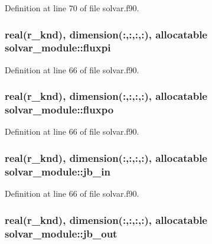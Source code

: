 Definition at line 70 of file solvar.\-f90.

\hypertarget{classsolvar__module_a9d3b4c1745b4b9a6145e2c08530d3daa}{
\subsubsection[{fluxpi}]{\setlength{\rightskip}{0pt plus 5cm}real(r\-\_\-knd), dimension(\-:,\-:,\-:,\-:), allocatable solvar\-\_\-module\-::fluxpi}}\label{classsolvar__module_a9d3b4c1745b4b9a6145e2c08530d3daa}


Definition at line 66 of file solvar.\-f90.

\hypertarget{classsolvar__module_a669bfbe1f13db0527664112817616ca8}{
\subsubsection[{fluxpo}]{\setlength{\rightskip}{0pt plus 5cm}real(r\-\_\-knd), dimension(\-:,\-:,\-:,\-:), allocatable solvar\-\_\-module\-::fluxpo}}\label{classsolvar__module_a669bfbe1f13db0527664112817616ca8}


Definition at line 66 of file solvar.\-f90.

\hypertarget{classsolvar__module_a1fdec8e2a20607eda34ee4fd101908b6}{
\subsubsection[{jb\-\_\-in}]{\setlength{\rightskip}{0pt plus 5cm}real(r\-\_\-knd), dimension(\-:,\-:,\-:,\-:), allocatable solvar\-\_\-module\-::jb\-\_\-in}}\label{classsolvar__module_a1fdec8e2a20607eda34ee4fd101908b6}


Definition at line 66 of file solvar.\-f90.

\hypertarget{classsolvar__module_a29676d4c4d7035869ce09911a15bbd58}{
\subsubsection[{jb\-\_\-out}]{\setlength{\rightskip}{0pt plus 5cm}real(r\-\_\-knd), dimension(\-:,\-:,\-:,\-:), allocatable solvar\-\_\-module\-::jb\-\_\-out}}\label{classsolvar__module_a29676d4c4d7035869ce09911a15bbd58}


